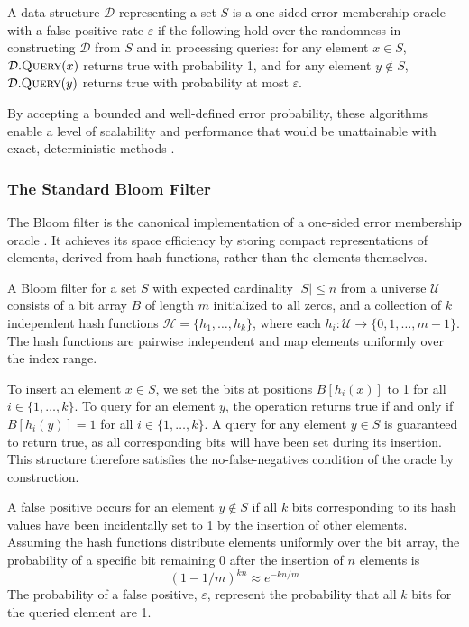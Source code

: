\begin{definition}
    A data structure $\mathcal{D}$ representing a set $S$ is a one-sided error membership oracle with a false positive rate $\varepsilon$ if the following hold over the randomness in constructing $\mathcal{D}$ from $S$ and in processing queries: for any element $x \in S$, $\mathcal{D}.\textsc{Query}(x)$ returns true with probability 1, and for any element $y \notin S$, $\mathcal{D}.\textsc{Query}(y)$ returns true with probability at most $\varepsilon$.
\end{definition}

By accepting a bounded and well-defined error probability, these algorithms enable a level of scalability and performance that would be unattainable with exact, deterministic methods \cite{Tarkoma2012TheoryAP, Chang2006BigtableAD}.

\subsubsection{The Standard Bloom Filter}

The Bloom filter is the canonical implementation of a one-sided error membership oracle \cite{Bloom1970SpacetimeTI}. It achieves its space efficiency by storing compact representations of elements, derived from hash functions, rather than the elements themselves.

\begin{definition}
    A Bloom filter for a set $S$ with expected cardinality $|S| \leq n$ from a universe $\mathcal{U}$ consists of a bit array $B$ of length $m$ initialized to all zeros, and a collection of $k$ independent hash functions $\mathcal{H} = \{h_1, \ldots, h_k\}$, where each $h_i : \mathcal{U} \to \{0, 1, \ldots, m-1\}$. The hash functions are pairwise independent and map elements uniformly over the index range.
\end{definition}

To insert an element $x \in S$, we set the bits at positions $B[h_i(x)]$ to 1 for all $i \in \{1, \ldots, k\}$. To query for an element $y$, the operation returns true if and only if $B[h_i(y)] = 1$ for all $i \in \{1, \ldots, k\}$. A query for any element $y \in S$ is guaranteed to return true, as all corresponding bits will have been set during its insertion. This structure therefore satisfies the no-false-negatives condition of the oracle by construction.

A false positive occurs for an element $y \notin S$ if all $k$ bits corresponding to its hash values have been incidentally set to 1 by the insertion of other elements. Assuming the hash functions distribute elements uniformly over the bit array, the probability of a specific bit remaining 0 after the insertion of $n$ elements is
$$(1 - 1/m)^{kn} \approx e^{-kn/m}$$
The probability of a false positive, $\varepsilon$, represent the probability that all $k$ bits for the queried element are 1.

